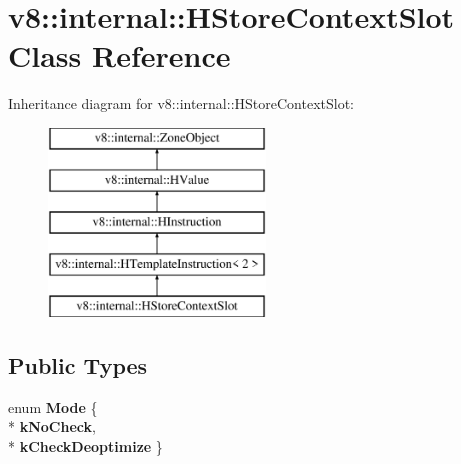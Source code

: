 \hypertarget{classv8_1_1internal_1_1_h_store_context_slot}{}\section{v8\+:\+:internal\+:\+:H\+Store\+Context\+Slot Class Reference}
\label{classv8_1_1internal_1_1_h_store_context_slot}
Inheritance diagram for v8\+:\+:internal\+:\+:H\+Store\+Context\+Slot\+:\begin{figure}[H]
\begin{center}
\leavevmode
\includegraphics[height=5.000000cm]{classv8_1_1internal_1_1_h_store_context_slot}
\end{center}
\end{figure}
\subsection*{Public Types}
\begin{DoxyCompactItemize}
\item 
enum {\bfseries Mode} \{ \\*
{\bfseries k\+No\+Check}, 
\\*
{\bfseries k\+Check\+Deoptimize}
 \}\hypertarget{classv8_1_1internal_1_1_h_store_context_slot_a2e9506d4d2d7e3b7ff05c298dd11dffb}{}\label{classv8_1_1internal_1_1_h_store_context_slot_a2e9506d4d2d7e3b7ff05c298dd11dffb}

\end{DoxyCompactItemize}
